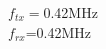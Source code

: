 \documentclass[preview]{standalone}
\begin{document}
\begin{center}
$f_{tx}=$0.42MHz\\$f_{rx}$=0.42MHz
\end{center}
\end{document}
